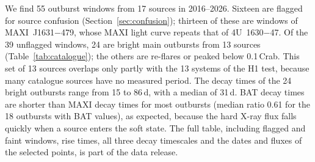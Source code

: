 \documentclass[fleqn,usenatbib]{mnras}
\begin{document}
We find 55 outburst windows from 17 sources in 2016--2026. Sixteen are flagged for source confusion (Section~\ref{sec:confusion}); thirteen of these are windows of MAXI~J1631$-$479, whose MAXI light curve repeats that of 4U~1630$-$47. Of the 39 unflagged windows, 24 are bright main outbursts from 13 sources (Table~\ref{tab:catalogue}); the others are re-flares or peaked below 0.1\,Crab. This set of 13 sources overlaps only partly with the 13 systems of the H1 test, because many catalogue sources have no measured period. The decay times of the 24 bright outbursts range from 15 to 86\,d, with a median of 31\,d. BAT decay times are shorter than MAXI decay times for most outbursts (median ratio 0.61 for the 18 outbursts with BAT values), as expected, because the hard X-ray flux falls quickly when a source enters the soft state. The full table, including flagged and faint windows, rise times, all three decay timescales and the dates and fluxes of the selected points, is part of the data release.
\end{document}
